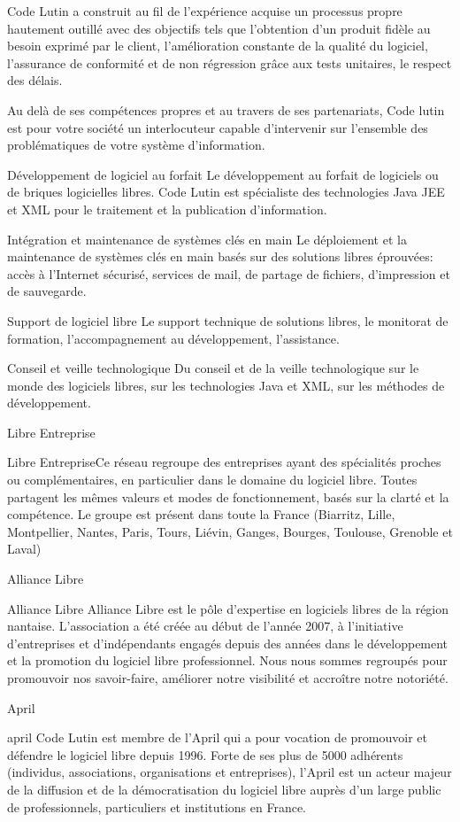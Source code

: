 Code Lutin a construit au fil de l’expérience acquise un processus propre hautement 
outillé avec des objectifs tels que l’obtention d’un produit fidèle au besoin exprimé par
 le client, l’amélioration constante de la qualité du logiciel, l’assurance de conformité 
 et de non régression grâce aux tests unitaires, le respect des délais.

Au delà de ses compétences propres et au travers de ses partenariats, Code lutin est pour 
votre société un interlocuteur capable d’intervenir sur l’ensemble des
problématiques de votre système d’information.

Développement de logiciel au forfait Le développement au forfait de logiciels ou
de briques logicielles libres. Code Lutin est spécialiste des technologies Java JEE 
et XML pour le traitement et la publication d'information. 


Intégration et maintenance de systèmes clés en main Le déploiement et la maintenance de
 systèmes clés en main basés sur des solutions libres éprouvées: accès à l'Internet sécurisé,
  services de mail, de partage de fichiers, d'impression et de sauvegarde.


Support de logiciel libre
Le support technique de solutions libres, le monitorat de formation, l'accompagnement
 au développement, l'assistance.


	Conseil et veille technologique
Du conseil et de la veille technologique sur le monde des logiciels libres, 
sur les technologies Java et XML, sur les méthodes de développement.




Libre Entreprise

Libre EntrepriseCe réseau regroupe des entreprises ayant des spécialités proches
ou complémentaires, en particulier dans le domaine du logiciel libre. Toutes
partagent les mêmes valeurs et modes de fonctionnement, basés sur la clarté et
la compétence. Le groupe est présent dans toute la France (Biarritz, Lille,
Montpellier, Nantes, Paris, Tours, Liévin, Ganges, Bourges, Toulouse, Grenoble et Laval)

Alliance Libre

Alliance Libre Alliance Libre est le pôle d’expertise en logiciels libres de la
région nantaise. L’association a été créée au début de l’année 2007, à
l’initiative d’entreprises et d’indépendants engagés depuis des années dans le
développement et la promotion du logiciel libre professionnel. Nous nous sommes
regroupés pour promouvoir nos savoir-faire, améliorer notre visibilité et
accroître notre notoriété.

April

april Code Lutin est membre de l’April qui a pour vocation de promouvoir et
défendre le logiciel libre depuis 1996. Forte de ses plus de 5000 adhérents
(individus, associations, organisations et entreprises), l’April est un acteur
majeur de la diffusion et de la démocratisation du logiciel libre auprès d’un
large public de professionnels, particuliers et institutions en France.
 